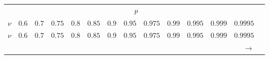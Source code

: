 \begin{center}
\begin{small}
\begin{longtable}[c]{rrrrrrrrrrrrrr}
&\multicolumn{12}{c}{$p$}\\\cline{2-13}
\multicolumn{1}{c}{$\nu$} & \multicolumn{1}{c}{ $0.6$ } & \multicolumn{1}{c}{ $0.7$ } & \multicolumn{1}{c}{ $0.75$ } & \multicolumn{1}{c}{ $0.8$ } & \multicolumn{1}{c}{ $0.85$ } & \multicolumn{1}{c}{ $0.9$ } & \multicolumn{1}{c}{ $0.95$ } & \multicolumn{1}{c}{ $0.975$ } & \multicolumn{1}{c}{ $0.99$ } & \multicolumn{1}{c}{ $0.995$ } & \multicolumn{1}{c}{ $0.999$ } & \multicolumn{1}{c}{ $0.9995$ }\\\midrule\endfirsthead
\multicolumn{1}{c}{$\nu$} & \multicolumn{1}{c}{ $0.6$ } & \multicolumn{1}{c}{ $0.7$ } & \multicolumn{1}{c}{ $0.75$ } & \multicolumn{1}{c}{ $0.8$ } & \multicolumn{1}{c}{ $0.85$ } & \multicolumn{1}{c}{ $0.9$ } & \multicolumn{1}{c}{ $0.95$ } & \multicolumn{1}{c}{ $0.975$ } & \multicolumn{1}{c}{ $0.99$ } & \multicolumn{1}{c}{ $0.995$ } & \multicolumn{1}{c}{ $0.999$ } & \multicolumn{1}{c}{ $0.9995$ }\\\midrule\endhead
&&&&&&&&&&&&\multicolumn{1}{r}{$\rightarrow$}\endfoot
\midrule\endlastfoot


\end{longtable}
\end{small}
\end{center}
